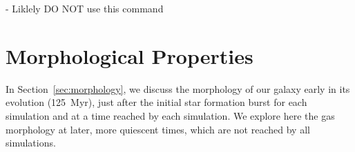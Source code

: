\documentclass[twocolumn]{aastex62}
\begin{document}





\appendix - Liklely DO NOT use this command
\setcounter{section}{0}%
\renewcommand\thesection{\thechapter.\Alph{section}}

\section{Morphological Properties}

In Section~\ref{sec:morphology}, we discuss the morphology of our galaxy early in its evolution (125~Myr), just after the initial star formation burst for each simulation and at a time reached by each simulation. We explore here the gas morphology at later, more quiescent times, which are not reached by all simulations.
\end{document}
